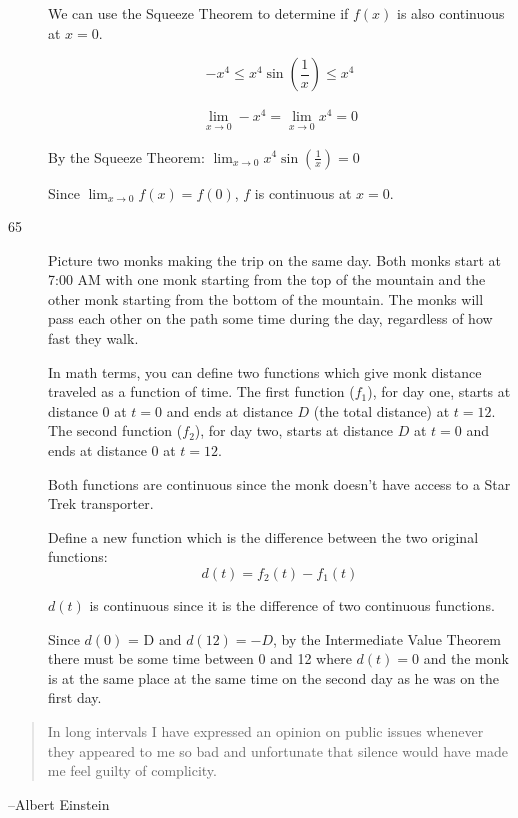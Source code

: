 \documentclass[letterpaper]{exam}
\begin{document}
\begin{description}
        We can use the Squeeze Theorem to determine if $f(x)$ is also continuous at
        $x = 0$.

        \[
          -x^4 \leq x^4 \sin \left( \frac{1}{x} \right) \leq x^4
        \]

        \begin{align*}
          \lim_{x \to 0} -x^4 = \lim_{x \to 0} x^4 = 0
        \end{align*}

        By the Squeeze Theorem: $\lim_{x \to 0} x^4 \sin \left( \frac{1}{x} \right) = 0$

        Since $\lim_{x \to 0} f(x) = f(0)$, $f$ is continuous at $x = 0$.

      \newpage

      \item[65]
        Picture two monks making the trip on the same day. Both monks start at 7:00 AM
        with one monk starting from the top of the mountain and the other monk starting
        from the bottom of the mountain. The monks will pass each other on the path some
        time during the day, regardless of how fast they walk.

        In math terms, you can define two functions which give monk distance traveled as a
        function of time. The first function ($f_1$), for day one, starts at distance 0 at
        $t = 0$ and ends at distance $D$ (the total distance) at $t = 12$. The second
        function ($f_2$), for day two, starts at distance $D$ at $t = 0$ and ends at
        distance 0 at $t = 12$.

        Both functions are continuous since the monk doesn't have access to a Star Trek
        transporter.

        Define a new function which is the difference between the two original functions:
        \[
          d(t) = f_2(t) - f_1(t)
        \]

        $d(t)$ is continuous since it is the difference of two continuous functions.
        
        Since $d(0)$ = D and $d(12) = -D$, by the Intermediate Value Theorem there must
        be some time between 0 and 12 where $d(t) = 0$ and the monk is at the same place
        at the same time on the second day as he was on the first day.

    \end{description}

  \else
    \vspace{10 cm}
    \begin{quote}
      \begin{em}
        In long intervals I have expressed an opinion on public issues whenever they
        appeared to me so bad and unfortunate that silence would have made me feel guilty
        of complicity. 
      \end{em}
    \end{quote}
    \hspace{1 cm} --Albert Einstein
  \fi
\end{document}
